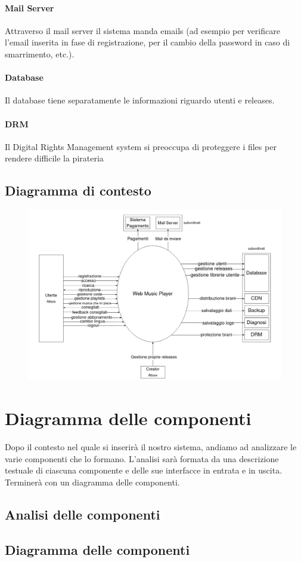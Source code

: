 \documentclass[a4paper,12pt]{article}
\begin{document}
\paragraph{Mail Server} Attraverso il mail server il sistema manda emails (ad esempio per verificare l’email inserita in fase di registrazione, per il cambio della password in caso di smarrimento, etc.).

\paragraph{Database} Il database tiene separatamente le informazioni riguardo utenti e releases.

\paragraph{DRM} Il Digital Rights Management system si preoccupa di proteggere i files per rendere difficile la pirateria

\newpage
\subsection{Diagramma di contesto}

\begin{figure}[htp]
    \centering
    \includegraphics[width=\textwidth]{diagrams/context.png}
\end{figure}

\newpage
\section{Diagramma delle componenti}

Dopo il contesto nel quale si inserirà il nostro sistema, andiamo ad analizzare le varie componenti che lo formano. L'analisi sarà formata da una descrizione testuale di ciascuna componente e delle sue interfacce in entrata e in uscita. Terminerà con un diagramma delle componenti.

\subsection{Analisi delle componenti}



\subsection{Diagramma delle componenti}
\end{document}
